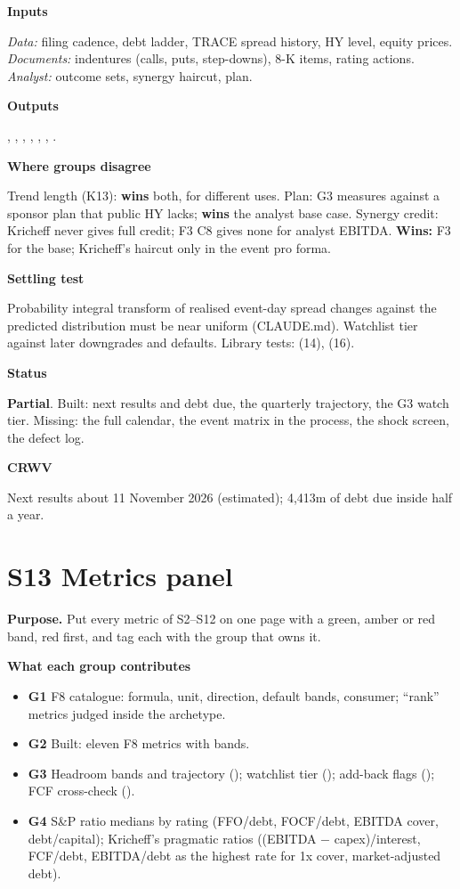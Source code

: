 \documentclass[11pt]{article}
\newcommand{\stpartial}{\textcolor{warn}{\textbf{Partial}}}
\newcommand{\GA}{\textcolor{gA}{\textbf{G1}}}
\newcommand{\GB}{\textcolor{gB}{\textbf{G2}}}
\newcommand{\GC}{\textcolor{gC}{\textbf{G3}}}
\newcommand{\GD}{\textcolor{gD}{\textbf{G4}}}
\newcommand{\fld}[1]{\par\medskip\noindent\textbf{\textcolor{steel}{#1}}\par\nopagebreak}
\begin{document}
\fld{Inputs} \emph{Data:} filing cadence, debt ladder, TRACE spread history, HY level, equity prices. \emph{Documents:} indentures (calls, puts, step-downs), 8-K items, rating actions. \emph{Analyst:} outcome sets, synergy haircut, plan.

\fld{Outputs} , , , , , , .

\fld{Where groups disagree} Trend length (K13): \textbf{wins} both, for different uses. Plan: G3 measures against a sponsor plan that public HY lacks; \textbf{wins} the analyst base case. Synergy credit: Kricheff never gives full credit; F3 C8 gives none for analyst EBITDA. \textbf{Wins:} F3 for the base; Kricheff's haircut only in the event pro forma.

\fld{Settling test} Probability integral transform of realised event-day spread changes against the predicted distribution must be near uniform (CLAUDE.md). Watchlist tier against later downgrades and defaults. Library tests:  (14),  (16).

\fld{Status} \stpartial. Built: next results and debt due, the quarterly trajectory, the G3 watch tier. Missing: the full calendar, the event matrix in the process, the shock screen, the defect log.

\fld{CRWV} Next results about 11 November 2026 (estimated); 4,413m of debt due inside half a year.

\section{S13 Metrics panel}\label{s13}

\textbf{Purpose.} Put every metric of S2--S12 on one page with a green, amber or red band, red first, and tag each with the group that owns it.

\fld{What each group contributes}
\begin{itemize}
\item \GA{} F8 catalogue: formula, unit, direction, default bands, consumer; ``rank'' metrics judged inside the archetype.
\item \GB{} Built: eleven F8 metrics with bands.
\item \GC{} Headroom bands and trajectory (); watchlist tier (); add-back flags (); FCF cross-check ().
\item \GD{} S\&P ratio medians by rating (FFO/debt, FOCF/debt, EBITDA cover, debt/capital); Kricheff's pragmatic ratios ((EBITDA $-$ capex)/interest, FCF/debt, EBITDA/debt as the highest rate for 1x cover, market-adjusted debt).
\end{itemize}
\end{document}
